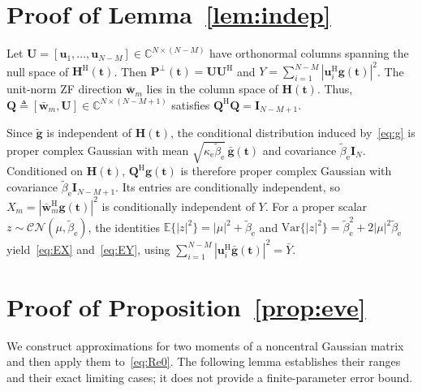 \documentclass[journal]{IEEEtran}
\newcommand{\E}{\mathbb{E}}
\newcommand{\CN}{\mathcal{CN}}
\newcommand{\bt}{\mathbf{t}}
\newcommand{\bg}{\mathbf{g}}
\newcommand{\gb}{\bar{\mathbf{g}}}
\newcommand{\gtl}{\tilde{\mathbf{g}}}
\newcommand{\bH}{\mathbf{H}}
\newcommand{\bI}{\mathbf{I}}
\newcommand{\wb}{\bar{\mathbf{w}}}
\newcommand{\PHp}{\mathbf{P}^{\perp}(\bt)}
\begin{document}
\appendices
\section{Proof of Lemma~\ref{lem:indep}}\label{app:indep}
Let $\mathbf U=[\mathbf u_1,\ldots,\mathbf u_{N-M}]\in\mathbb C^{N\times(N-M)}$ have orthonormal columns spanning the null space of $\bH^{\mathrm{H}}(\bt)$. Then $\PHp=\mathbf U\mathbf U^{\mathrm{H}}$ and $Y=\sum_{i=1}^{N-M}|\mathbf u_i^{\mathrm{H}}\bg(\bt)|^2$. The unit-norm ZF direction $\wb_m$ lies in the column space of $\bH(\bt)$. Thus, $\mathbf Q\triangleq[\wb_m,\mathbf U]\in\mathbb C^{N\times(N-M+1)}$ satisfies $\mathbf Q^{\mathrm{H}}\mathbf Q=\bI_{N-M+1}$.

Since $\gtl$ is independent of $\bH(\bt)$, the conditional distribution induced by~\eqref{eq:g} is proper complex Gaussian with mean $\sqrt{\kappa_{\mathrm{e}}\tilde\beta_{\mathrm{e}}}\,\gb(\bt)$ and covariance $\tilde\beta_{\mathrm{e}}\bI_N$. Conditioned on $\bH(\bt)$, $\mathbf Q^{\mathrm{H}}\bg(\bt)$ is therefore proper complex Gaussian with covariance $\tilde\beta_{\mathrm{e}}\bI_{N-M+1}$. Its entries are conditionally independent, so $X_m=|\wb_m^{\mathrm{H}}\bg(\bt)|^2$ is conditionally independent of $Y$. For a proper scalar $z\sim\CN(\mu,\tilde\beta_{\mathrm{e}})$, the identities $\E\{|z|^2\}=|\mu|^2+\tilde\beta_{\mathrm{e}}$ and $\mathrm{Var}\{|z|^2\}=\tilde\beta_{\mathrm{e}}^2+2|\mu|^2\tilde\beta_{\mathrm{e}}$ yield~\eqref{eq:EX} and~\eqref{eq:EY}, using $\sum_{i=1}^{N-M}|\mathbf u_i^{\mathrm{H}}\gb(\bt)|^2=\bar Y$.

\section{Proof of Proposition~\ref{prop:eve}}\label{app:det}
We construct approximations for two moments of a noncentral Gaussian matrix and then apply them to~\eqref{eq:Re0}. The following lemma establishes their ranges and their exact limiting cases; it does not provide a finite-parameter error bound.
\end{document}
